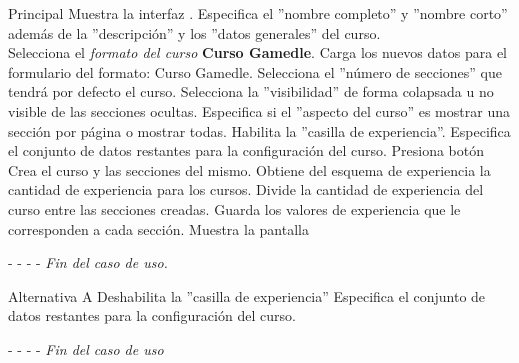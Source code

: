
\begin{UCtrayectoria}{Principal}
    \moodle Muestra la interfaz . 
    \actor Especifica el ''nombre completo'' y ''nombre corto'' además de la ''descripción'' y los ''datos generales'' del curso.\\
    
    \setcounter{enumi}{0}
    \actor Selecciona el {\it formato del curso} {\bf Curso Gamedle}.  
    \sistema Carga los nuevos datos para el formulario del formato: Curso Gamedle.
    \actor Selecciona el ''número de secciones'' que tendrá por defecto el curso.
    \actor Selecciona la ''visibilidad'' de forma colapsada u no visible de las secciones ocultas.
    \actor Especifica si el ''aspecto del curso'' es mostrar una sección por página o mostrar todas.
    \actor Habilita la ''casilla de experiencia''. 
    \actor Especifica el conjunto de datos restantes para la configuración del curso.
    \actor Presiona botón    %
    \sistema Crea el curso y las secciones del mismo.
    \sistema Obtiene del esquema de experiencia la cantidad de experiencia para los cursos.
    \sistema Divide la cantidad de experiencia del curso entre las secciones creadas.
    \sistema Guarda los valores de experiencia que le corresponden a cada sección.
    \sistema Muestra la pantalla 
    \item[- -] - - {\em Fin del caso de uso.}
\end{UCtrayectoria}


\begin{UCtrayectoria}{Alternativa A}
    \actor Deshabilita la ''casilla de experiencia''
    \actor Especifica el conjunto de datos restantes para la configuración del curso.
    \item[- -] - - {\em Fin del caso de uso}
\end{UCtrayectoria}

